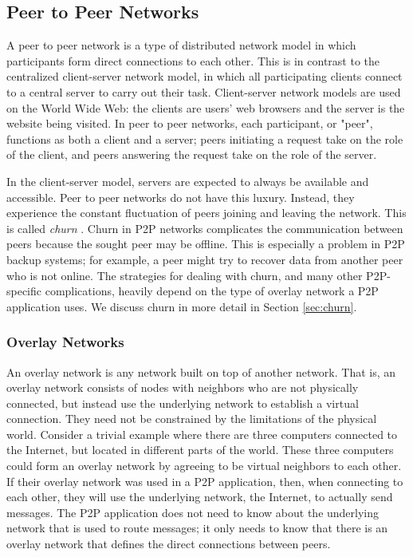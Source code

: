\documentclass[12pt]{report}
\begin{document}
\subsection{Peer to Peer Networks}

A peer to peer network is a type of distributed network model in which participants form direct connections to each other. This is in contrast to the centralized client-server network model, in which all participating clients connect to a central server to carry out their task. Client-server network models are used on the World Wide Web: the clients are users' web browsers and the server is the website being visited. In peer to peer networks, each participant, or "peer", functions as both a client and a server; peers initiating a request take on the role of the client, and peers answering the request take on the role of the server.

In the client-server model, servers are expected to always be available and accessible. Peer to peer networks do not have this luxury. Instead, they experience the constant fluctuation of peers joining and leaving the network. This is called \textit{churn} \cite{StorageSearchP2PNetworks}. Churn in P2P networks complicates the communication between peers because the sought peer may be offline. This is especially a problem in P2P backup systems; for example, a peer might try to recover data from another peer who is not online. The strategies for dealing with churn, and many other P2P-specific complications, heavily depend on the type of overlay network a P2P application uses. We discuss churn in more detail in Section \ref{sec:churn}.


\subsubsection{Overlay Networks}

An overlay network is any network built on top of another network. That is, an overlay network consists of nodes with neighbors who are not physically connected, but instead use the underlying network to establish a virtual connection. They need not be constrained by the limitations of the physical world. Consider a trivial example where there are three computers connected to the Internet, but located in different parts of the world. These three computers could form an overlay network by agreeing to be virtual neighbors to each other. If their overlay network was used in a P2P application, then, when connecting to each other, they will use the underlying network, the Internet, to actually send messages. The P2P application does not need to know about the underlying network that is used to route messages; it only needs to know that there is an overlay network that defines the direct connections between peers.
\end{document}

